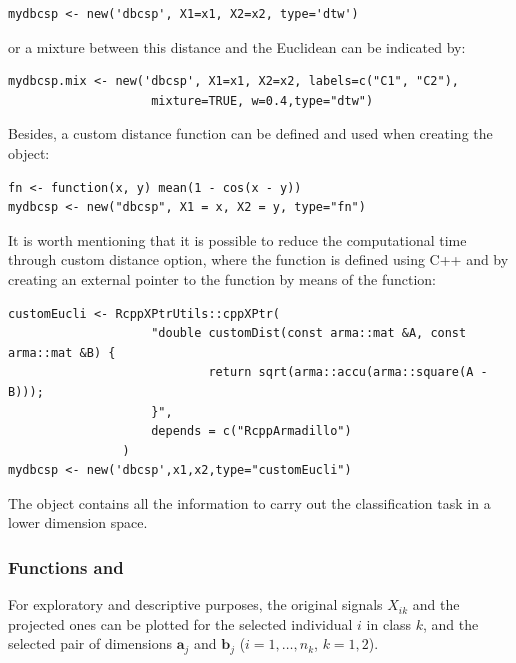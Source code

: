 \begin{itemize}
\begin{verbatim}
mydbcsp <- new('dbcsp', X1=x1, X2=x2, type='dtw')
\end{verbatim}

or a mixture between this distance and the Euclidean can be indicated by:

\begin{verbatim}
mydbcsp.mix <- new('dbcsp', X1=x1, X2=x2, labels=c("C1", "C2"), 
                    mixture=TRUE, w=0.4,type="dtw")
\end{verbatim}


Besides, a custom distance function can be defined and used when creating the object:

\begin{verbatim}
fn <- function(x, y) mean(1 - cos(x - y))
mydbcsp <- new("dbcsp", X1 = x, X2 = y, type="fn")
\end{verbatim}

It is worth mentioning that it is possible to reduce the computational time  through  custom distance option, where the function is defined using C++ and by creating an external pointer to the function by means of the  function:

\begin{verbatim}
customEucli <- RcppXPtrUtils::cppXPtr(
                    "double customDist(const arma::mat &A, const arma::mat &B) {
                            return sqrt(arma::accu(arma::square(A - B)));
                    }", 
                    depends = c("RcppArmadillo")
                )
mydbcsp <- new('dbcsp',x1,x2,type="customEucli")
\end{verbatim}


The object contains all the information to carry out the classification task in a lower dimension space. 
\end{itemize}

 \subsubsection{Functions  and }
 For exploratory and descriptive purposes, the original signals $X_{i k}$ and the projected ones can be plotted for the selected individual $i$ in class $k$, and  the selected pair of dimensions $\mathbf{a}_j$ and $\mathbf{b}_j$ ($i= 1, \ldots, n_k$, $k=1,2$).
 
